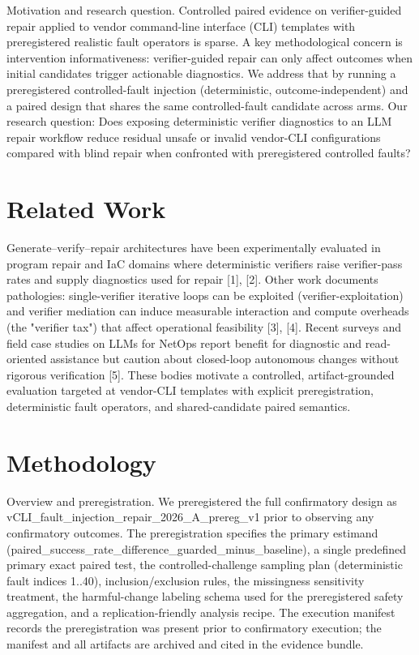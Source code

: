 \documentclass[conference]{IEEEtran}
\begin{document}
Motivation and research question. Controlled paired evidence on verifier-guided repair applied to vendor command-line interface (CLI) templates with preregistered realistic fault operators is sparse. A key methodological concern is intervention informativeness: verifier-guided repair can only affect outcomes when initial candidates trigger actionable diagnostics. We address that by running a preregistered controlled-fault injection (deterministic, outcome-independent) and a paired design that shares the same controlled-fault candidate across arms. Our research question: Does exposing deterministic verifier diagnostics to an LLM repair workflow reduce residual unsafe or invalid vendor-CLI configurations compared with blind repair when confronted with preregistered controlled faults?

\section{Related Work}
Generate--verify--repair architectures have been experimentally evaluated in program repair and IaC domains where deterministic verifiers raise verifier-pass rates and supply diagnostics used for repair [1], [2]. Other work documents pathologies: single-verifier iterative loops can be exploited (verifier-exploitation) and verifier mediation can induce measurable interaction and compute overheads (the "verifier tax") that affect operational feasibility [3], [4]. Recent surveys and field case studies on LLMs for NetOps report benefit for diagnostic and read-oriented assistance but caution about closed-loop autonomous changes without rigorous verification [5]. These bodies motivate a controlled, artifact-grounded evaluation targeted at vendor-CLI templates with explicit preregistration, deterministic fault operators, and shared-candidate paired semantics.

\section{Methodology}
Overview and preregistration. We preregistered the full confirmatory design as vCLI\_fault\_injection\_repair\_2026\_A\_prereg\_v1 prior to observing any confirmatory outcomes. The preregistration specifies the primary estimand (paired\_success\_rate\_difference\_guarded\_minus\_baseline), a single predefined primary exact paired test, the controlled-challenge sampling plan (deterministic fault indices 1..40), inclusion/exclusion rules, the missingness sensitivity treatment, the harmful-change labeling schema used for the preregistered safety aggregation, and a replication-friendly analysis recipe. The execution manifest records the preregistration was present prior to confirmatory execution; the manifest and all artifacts are archived and cited in the evidence bundle.
\end{document}
